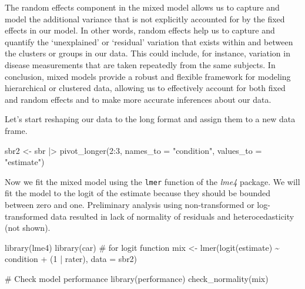 \documentclass[
  letterpaper,
]{book}
\newenvironment{Shaded}{\begin{snugshade}}{\end{snugshade}}
\newcommand{\AttributeTok}[1]{\textcolor[rgb]{0.40,0.45,0.13}{#1}}
\newcommand{\CommentTok}[1]{\textcolor[rgb]{0.37,0.37,0.37}{#1}}
\newcommand{\DecValTok}[1]{\textcolor[rgb]{0.68,0.00,0.00}{#1}}
\newcommand{\FunctionTok}[1]{\textcolor[rgb]{0.28,0.35,0.67}{#1}}
\newcommand{\NormalTok}[1]{\textcolor[rgb]{0.00,0.23,0.31}{#1}}
\newcommand{\OtherTok}[1]{\textcolor[rgb]{0.00,0.23,0.31}{#1}}
\newcommand{\SpecialCharTok}[1]{\textcolor[rgb]{0.37,0.37,0.37}{#1}}
\newcommand{\StringTok}[1]{\textcolor[rgb]{0.13,0.47,0.30}{#1}}
\begin{document}
The random effects component in the mixed model allows us to capture and
model the additional variance that is not explicitly accounted for by
the fixed effects in our model. In other words, random effects help us
to capture and quantify the `unexplained' or `residual' variation that
exists within and between the clusters or groups in our data. This could
include, for instance, variation in disease measurements that are taken
repeatedly from the same subjects. In conclusion, mixed models provide a
robust and flexible framework for modeling hierarchical or clustered
data, allowing us to effectively account for both fixed and random
effects and to make more accurate inferences about our data.

Let's start reshaping our data to the long format and assign them to a
new data frame.

\begin{Shaded}
\begin{Highlighting}[]
\NormalTok{sbr2 }\OtherTok{\textless{}{-}}\NormalTok{ sbr }\SpecialCharTok{|\textgreater{}} 
  \FunctionTok{pivot\_longer}\NormalTok{(}\DecValTok{2}\SpecialCharTok{:}\DecValTok{3}\NormalTok{, }\AttributeTok{names\_to =} \StringTok{"condition"}\NormalTok{, }\AttributeTok{values\_to =} \StringTok{"estimate"}\NormalTok{)}
\end{Highlighting}
\end{Shaded}

Now we fit the mixed model using the \texttt{lmer} function of the
\emph{lme4} package. We will fit the model to the logit of the estimate
because they should be bounded between zero and one. Preliminary
analysis using non-transformed or log-transformed data resulted in lack
of normality of residuals and heterocedasticity (not shown).

\begin{Shaded}
\begin{Highlighting}[]
\FunctionTok{library}\NormalTok{(lme4) }
\FunctionTok{library}\NormalTok{(car) }\CommentTok{\# for logit function}
\NormalTok{mix }\OtherTok{\textless{}{-}} \FunctionTok{lmer}\NormalTok{(}\FunctionTok{logit}\NormalTok{(estimate) }\SpecialCharTok{\textasciitilde{}}\NormalTok{ condition }\SpecialCharTok{+}\NormalTok{ (}\DecValTok{1} \SpecialCharTok{|}\NormalTok{ rater), }\AttributeTok{data =}\NormalTok{ sbr2)}

\CommentTok{\# Check model performance}
\FunctionTok{library}\NormalTok{(performance)}
\FunctionTok{check\_normality}\NormalTok{(mix)}
\end{Highlighting}
\end{Shaded}
\end{document}
